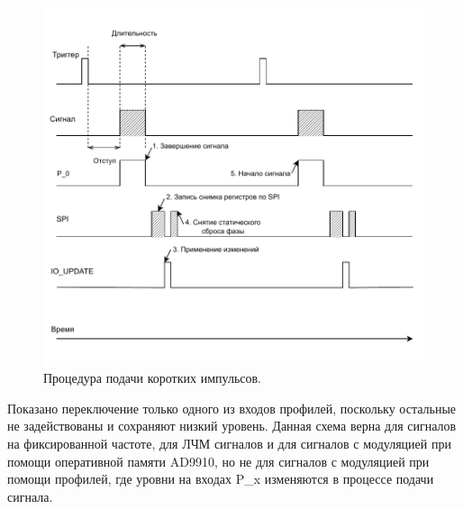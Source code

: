 \documentclass[rusmathsym, eqnumwithinsec, amspack, hyperref]{bomgost}
\begin{document}
%
%
\begin{gostfigure}
\begin{figure}[H]
\centering
\includegraphics{data/detailed_timing_diagram.drawio.pdf}
\caption{Процедура подачи коротких импульсов.}
\label{fig:detailed_timing_diagram}
\end{figure}
\end{gostfigure}

Показано переключение только одного из входов профилей, поскольку остальные не задействованы и сохраняют низкий уровень. Данная схема верна для сигналов на фиксированной частоте, для ЛЧМ сигналов и для сигналов с модуляцией при помощи оперативной памяти AD9910, но не для сигналов с модуляцией при помощи профилей, где уровни на входах P\_x изменяются в процессе подачи сигнала.
\end{document}
